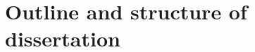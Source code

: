\documentclass[12pt, letterpaper]{article}
\begin{document}



\section{Outline and structure of dissertation} \label{sec:Outline}

\end{document}
